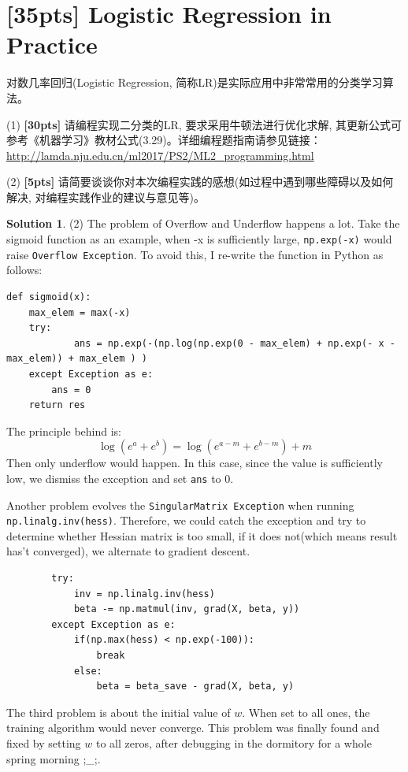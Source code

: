 \documentclass[a4paper,UTF8]{article}
\numberwithin{equation}{section}
\theoremstyle{definition}
\newtheorem*{solution}{Solution}
\begin{document}
\section{[35pts] Logistic Regression in Practice} 
对数几率回归(Logistic Regression, 简称LR)是实际应用中非常常用的分类学习算法。

(1) \textbf{[30pts]} 请编程实现二分类的LR, 要求采用牛顿法进行优化求解, 其更新公式可参考《机器学习》教材公式(3.29)。详细编程题指南请参见链接：\url{http://lamda.nju.edu.cn/ml2017/PS2/ML2_programming.html}

(2) \textbf{[5pts]} 请简要谈谈你对本次编程实践的感想(如过程中遇到哪些障碍以及如何解决, 对编程实践作业的建议与意见等)。
\begin{solution}
(2) The problem of Overflow and Underflow happens a lot. Take the sigmoid function as an example, when -x is sufficiently large, \texttt{np.exp(-x)} would raise \texttt{Overflow Exception}. To avoid this, I re-write the function in Python as follows:
\begin{verbatim}
def sigmoid(x):
    max_elem = max(-x) 
    try: 
        	ans = np.exp(-(np.log(np.exp(0 - max_elem) + np.exp(- x - max_elem)) + max_elem ) )
    except Exception as e:
        ans = 0
    return res
\end{verbatim}
The principle behind is:
\begin{equation}
\log{(e^a + e^b)} = \log{(e^{a-m} + e^{b-m})} + m
\end{equation}
Then only underflow would happen. In this case, since the value is sufficiently low, we dismiss the exception and set \texttt{ans} to 0.

\end{solution}
Another problem evolves the \texttt{SingularMatrix Exception}  when running  \texttt{np.linalg.inv(hess)}. Therefore, we could catch the exception and try to determine whether Hessian matrix is too small, if it does not(which means result has't converged), we alternate to gradient descent.
\begin{verbatim}
        try:
            inv = np.linalg.inv(hess)
            beta -= np.matmul(inv, grad(X, beta, y))
        except Exception as e:
            if(np.max(hess) < np.exp(-100)):
                break
            else:
                beta = beta_save - grad(X, beta, y)
\end{verbatim}
The third problem is about the initial value of $w$. When set to all ones, the training algorithm would never converge. This problem was finally found and fixed by setting $w$ to all zeros, after debugging in the dormitory for a whole spring morning ;\_;.
\end{document}
